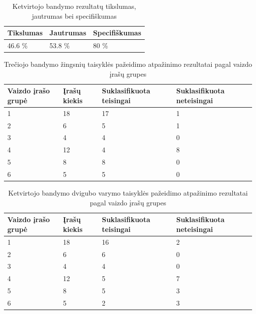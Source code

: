 \documentclass{VUMIFPSbakalaurinis}
\begin{document}
\begin{table}[H]\footnotesize
	\centering
	\caption{Ketvirtojo bandymo rezultatų tikslumas, jautrumas bei specifiškumas}
	{\begin{tabular}{|p{5cm}|p{5cm}|p{5cm}|} \hline
			\textbf{Tikslumas} & \textbf{Jautrumas} & \textbf{Specifiškumas} \\
			\hline
			46.6 \%  & 53.8 \%    & 80 \%    \\
			
			\hline
	\end{tabular}}
	\label{tab:fourth_trial_percents}
\end{table}

\begin{table}[H]\footnotesize
	\centering
	\caption{Trečiojo bandymo žingsnių taisyklės pažeidimo atpažinimo rezultatai pagal vaizdo įrašų grupes}
	{\begin{tabular}{|p{3cm}|p{3cm}|p{3cm}|p{3cm}|} \hline
			\textbf{Vaizdo įrašo grupė} & \textbf{Įrašų kiekis} & \textbf{Suklasifikuota teisingai} & \textbf{Suklasifikuota neteisingai} \\
			\hline
			1  & 18    & 17    & 1    \\
			\hline
			2  & 6    & 5  & 1     \\
			\hline
			3  & 4    & 4   & 0    \\
			\hline
			4  & 12    & 4  & 8     \\
			\hline
			5  & 8    & 8  & 0     \\
			\hline
			6  & 5    & 5  & 0    \\
			\hline
	\end{tabular}}
	\label{tab:third_trial_recognizion_results_grouped}
\end{table}

\begin{table}[H]\footnotesize
	\centering
	\caption{Ketvirtojo bandymo dvigubo varymo taisyklės pažeidimo atpažinimo rezultatai pagal vaizdo įrašų grupes}
	{\begin{tabular}{|p{3cm}|p{3cm}|p{3cm}|p{3cm}|} \hline
			\textbf{Vaizdo įrašo grupė} & \textbf{Įrašų kiekis} & \textbf{Suklasifikuota teisingai} & \textbf{Suklasifikuota neteisingai} \\
			\hline
			1  & 18    & 16    & 2    \\
			\hline
			2  & 6    & 6  & 0     \\
			\hline
			3  & 4    & 4   & 0    \\
			\hline
			4  & 12    & 5  & 7     \\
			\hline
			5  & 8    & 5  & 3     \\
			\hline
			6  & 5    & 2  & 3     \\
			\hline
	\end{tabular}}
	\label{tab:fourth_trial_recognizion_results_grouped}
\end{table}
\end{document}
